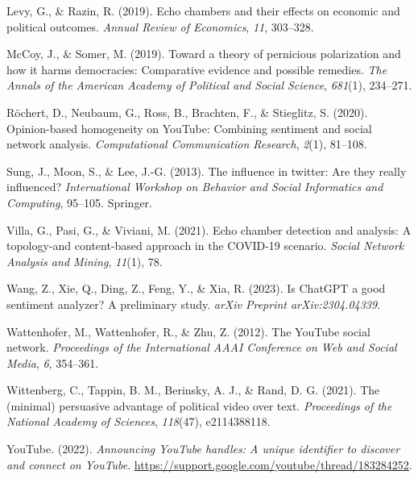 \documentclass[
  man,floatsintext]{apa6}
\newlength{\cslhangindent}
\newenvironment{CSLReferences}[2] %
 {\begin{list}{}{%
  \setlength{\itemindent}{0pt}
  \setlength{\leftmargin}{0pt}
  \setlength{\parsep}{0pt}
  \ifodd #1
   \setlength{\leftmargin}{\cslhangindent}
   \setlength{\itemindent}{-1\cslhangindent}
  \fi
  \setlength{\itemsep}{#2\baselineskip}}}
 {\end{list}}
\begin{document}
\begin{CSLReferences}{1}{0}
Levy, G., \& Razin, R. (2019). Echo chambers and their effects on economic and political outcomes. \emph{Annual Review of Economics}, \emph{11}, 303--328.

McCoy, J., \& Somer, M. (2019). Toward a theory of pernicious polarization and how it harms democracies: Comparative evidence and possible remedies. \emph{The Annals of the American Academy of Political and Social Science}, \emph{681}(1), 234--271.

Röchert, D., Neubaum, G., Ross, B., Brachten, F., \& Stieglitz, S. (2020). Opinion-based homogeneity on YouTube: Combining sentiment and social network analysis. \emph{Computational Communication Research}, \emph{2}(1), 81--108.

Sung, J., Moon, S., \& Lee, J.-G. (2013). The influence in twitter: Are they really influenced? \emph{International Workshop on Behavior and Social Informatics and Computing}, 95--105. Springer.

Villa, G., Pasi, G., \& Viviani, M. (2021). Echo chamber detection and analysis: A topology-and content-based approach in the COVID-19 scenario. \emph{Social Network Analysis and Mining}, \emph{11}(1), 78.

Wang, Z., Xie, Q., Ding, Z., Feng, Y., \& Xia, R. (2023). Is ChatGPT a good sentiment analyzer? A preliminary study. \emph{arXiv Preprint arXiv:2304.04339}.

Wattenhofer, M., Wattenhofer, R., \& Zhu, Z. (2012). The YouTube social network. \emph{Proceedings of the International AAAI Conference on Web and Social Media}, \emph{6}, 354--361.

Wittenberg, C., Tappin, B. M., Berinsky, A. J., \& Rand, D. G. (2021). The (minimal) persuasive advantage of political video over text. \emph{Proceedings of the National Academy of Sciences}, \emph{118}(47), e2114388118.

YouTube. (2022). \emph{Announcing YouTube handles: A unique identifier to discover and connect on YouTube}. \url{https://support.google.com/youtube/thread/183284252}.

\end{CSLReferences}
\end{document}
